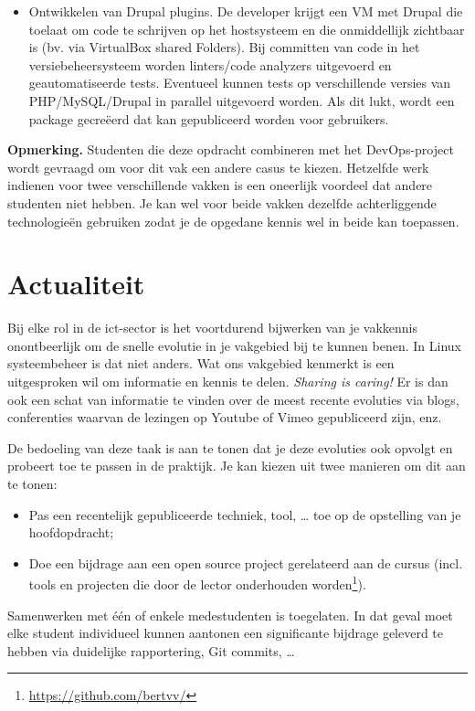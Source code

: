 \begin{itemize}
  \item Ontwikkelen van Drupal plugins. De developer krijgt een VM met Drupal die toelaat om code te schrijven op het hostsysteem en die onmiddellijk zichtbaar is (bv. via VirtualBox shared Folders). Bij committen van code in het versiebeheersysteem worden linters/code analyzers uitgevoerd en geautomatiseerde tests. Eventueel kunnen tests op verschillende versies van PHP/MySQL/Drupal in parallel uitgevoerd worden. Als dit lukt, wordt een package gecreëerd dat kan gepubliceerd worden voor gebruikers.
\end{itemize}

\textbf{Opmerking.} Studenten die deze opdracht combineren met het DevOps-project wordt gevraagd om voor dit vak een andere casus te kiezen. Hetzelfde werk indienen voor twee verschillende vakken is een oneerlijk voordeel dat andere studenten niet hebben. Je kan wel voor beide vakken dezelfde achterliggende technologieën gebruiken zodat je de opgedane kennis wel in beide kan toepassen.

\section{Actualiteit}
\label{sec:actualiteit}

Bij elke rol in de ict-sector is het voortdurend bijwerken van je vakkennis onontbeerlijk om de snelle evolutie in je vakgebied bij te kunnen benen. In Linux systeembeheer is dat niet anders. Wat ons vakgebied kenmerkt is een uitgesproken wil om informatie en kennis te delen. \emph{Sharing is caring!} Er is dan ook een schat van informatie te vinden over de meest recente evoluties via blogs, conferenties waarvan de lezingen op Youtube of Vimeo gepubliceerd zijn, enz.

De bedoeling van deze taak is aan te tonen dat je deze evoluties ook opvolgt en probeert toe te passen in de praktijk. Je kan kiezen uit twee manieren om dit aan te tonen:

\begin{itemize}
  \item Pas een recentelijk gepubliceerde techniek, tool, \ldots{} toe op de opstelling van je hoofdopdracht;
  \item Doe een bijdrage aan een open source project gerelateerd aan de cursus (incl. tools en projecten die door de lector onderhouden worden\footnote{\url{https://github.com/bertvv/}}).
\end{itemize}

Samenwerken met één of enkele medestudenten is toegelaten. In dat geval moet elke student individueel kunnen aantonen een significante bijdrage geleverd te hebben via duidelijke rapportering, Git commits, \ldots

